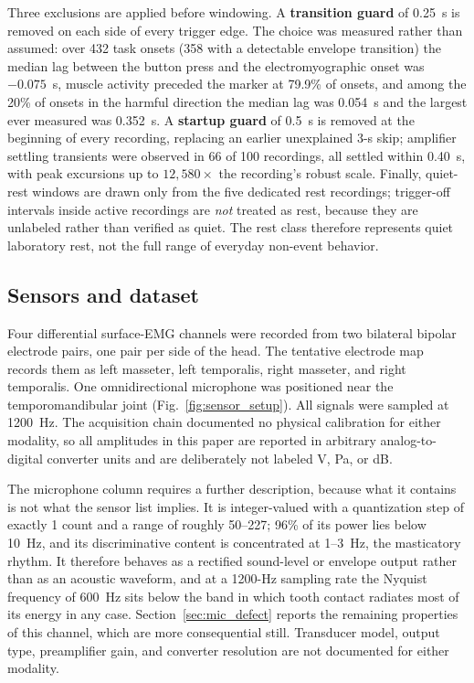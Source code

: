 \documentclass[pdflatex,sn-nature,iicol]{sn-jnl}
\begin{document}
Three exclusions are applied before windowing. A \textbf{transition guard} of 0.25~s is removed on each side of every trigger edge. The choice was measured rather than assumed: over 432 task onsets (358 with a detectable envelope transition) the median lag between the button press and the electromyographic onset was $-0.075$~s, muscle activity preceded the marker at 79.9\% of onsets, and among the 20\% of onsets in the harmful direction the median lag was 0.054~s and the largest ever measured was 0.352~s. A \textbf{startup guard} of 0.5~s is removed at the beginning of every recording, replacing an earlier unexplained 3-s skip; amplifier settling transients were observed in 66 of 100 recordings, all settled within 0.40~s, with peak excursions up to $12{,}580\times$ the recording's robust scale. Finally, quiet-rest windows are drawn only from the five dedicated rest recordings; trigger-off intervals inside active recordings are \emph{not} treated as rest, because they are unlabeled rather than verified as quiet. The rest class therefore represents quiet laboratory rest, not the full range of everyday non-event behavior.

\subsection{Sensors and dataset}

Four differential surface-EMG channels were recorded from two bilateral bipolar electrode pairs, one pair per side of the head. The tentative electrode map records them as left masseter, left temporalis, right masseter, and right temporalis. One omnidirectional microphone was positioned near the temporomandibular joint (Fig.~\ref{fig:sensor_setup}). All signals were sampled at 1200~Hz. The acquisition chain documented no physical calibration for either modality, so all amplitudes in this paper are reported in arbitrary analog-to-digital converter units and are deliberately not labeled \textmu V, Pa, or dB.

The microphone column requires a further description, because what it contains is not what the sensor list implies. It is integer-valued with a quantization step of exactly 1 count and a range of roughly 50--227; 96\% of its power lies below 10~Hz, and its discriminative content is concentrated at 1--3~Hz, the masticatory rhythm. It therefore behaves as a rectified sound-level or envelope output rather than as an acoustic waveform, and at a 1200-Hz sampling rate the Nyquist frequency of 600~Hz sits below the band in which tooth contact radiates most of its energy in any case. Section~\ref{sec:mic_defect} reports the remaining properties of this channel, which are more consequential still. Transducer model, output type, preamplifier gain, and converter resolution are not documented for either modality.
\end{document}
